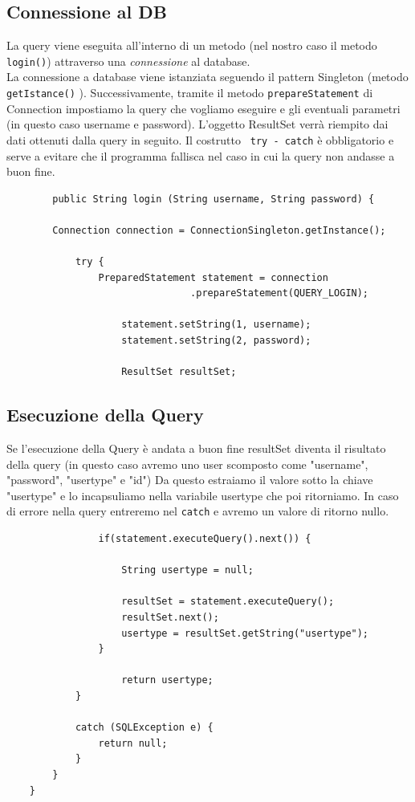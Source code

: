 \documentclass[a4paper,12 pt]{article}
\begin{document}
	\subsection{Connessione al DB}
	La query viene eseguita all'interno di un metodo (nel nostro caso il metodo \texttt{login()}) attraverso una \textit{connessione} al database.\\
	La connessione a database viene istanziata seguendo il pattern Singleton (metodo \texttt{getIstance()} ). Successivamente, tramite il metodo \texttt{prepareStatement} di Connection impostiamo la query che vogliamo eseguire e gli eventuali parametri (in questo caso username e password). L'oggetto ResultSet verrà riempito dai dati ottenuti dalla query in seguito. Il costrutto \texttt{ try - catch} è obbligatorio e serve a evitare che il programma fallisca nel caso in cui la query non andasse a buon fine.
	
	\begin{lstlisting}
		public String login (String username, String password) {
		
		Connection connection = ConnectionSingleton.getInstance();
			
			try {
				PreparedStatement statement = connection
								.prepareStatement(QUERY_LOGIN);
			
					statement.setString(1, username);
					statement.setString(2, password);
	
					ResultSet resultSet;
	\end{lstlisting}
	
	\subsection{Esecuzione della Query}
	Se l'esecuzione della Query è andata a buon fine resultSet diventa il risultato della query (in questo caso avremo uno user scomposto come "username", "password", "usertype" e "id")
	Da questo estraiamo il valore sotto la chiave "usertype" e lo incapsuliamo nella variabile usertype che poi ritorniamo. In caso di errore nella query entreremo nel \texttt{catch} e avremo un valore di ritorno nullo.
	\begin{lstlisting}
				if(statement.executeQuery().next()) {
				
					String usertype = null;
					
					resultSet = statement.executeQuery();
					resultSet.next();
					usertype = resultSet.getString("usertype");
				}
		
					return usertype;
			}
		
			catch (SQLException e) {
				return null;
			}
		}
	}
	\end{lstlisting}
\clearpage
\end{document}
